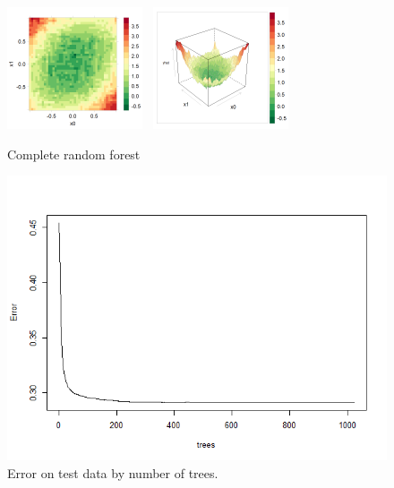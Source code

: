 \documentclass[11pt,openany,american,usenames,dvipsnames,svgnames,x11names,table,isodate]{article}
\numberwithin{equation}{section}
\numberwithin{figure}{section}
\begin{document}
\begin{figure}
\noindent \begin{centering}
\includegraphics[width=40mm]{fig/rf-1024-tree-levelplot}~
\includegraphics[width=40mm]{fig/rf-1024-tree-wireframe}
\par\end{centering}

\protect\caption{\label{fig:random-forest}Complete random forest}
\end{figure}
\begin{figure}
\noindent \begin{centering}
\includegraphics[width=12cm]{fig/rf-1024-tree-forest}
\par\end{centering}

\protect\caption{\label{fig:Error-on-independent}Error on test data by number of trees.}
\end{figure}
\end{document}
